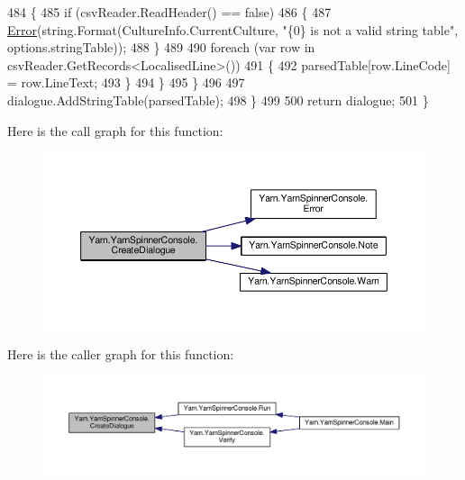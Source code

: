 \begin{DoxyCode}
484                     \{
485                         \textcolor{keywordflow}{if} (csvReader.ReadHeader() == \textcolor{keyword}{false})
486                         \{
487                             \hyperlink{a00172_a2f63f9f5b7634cb50ee75ff2eb18b137}{Error}(\textcolor{keywordtype}{string}.Format(CultureInfo.CurrentCulture, \textcolor{stringliteral}{"\{0\} is not a valid string
       table"}, options.stringTable));
488                         \}
489 
490                         \textcolor{keywordflow}{foreach} (var row \textcolor{keywordflow}{in} csvReader.GetRecords<LocalisedLine>())
491                         \{
492                             parsedTable[row.LineCode] = row.LineText;
493                         \}
494                     \}
495                 \}
496 
497                 dialogue.AddStringTable(parsedTable);
498             \}
499 
500             \textcolor{keywordflow}{return} dialogue;
501         \}
\end{DoxyCode}


Here is the call graph for this function\-:
\nopagebreak
\begin{figure}[H]
\begin{center}
\leavevmode
\includegraphics[width=350pt]{a00172_aab244361a510cee18ad2f636d110e0d5_cgraph}
\end{center}
\end{figure}




Here is the caller graph for this function\-:
\nopagebreak
\begin{figure}[H]
\begin{center}
\leavevmode
\includegraphics[width=350pt]{a00172_aab244361a510cee18ad2f636d110e0d5_icgraph}
\end{center}
\end{figure}


